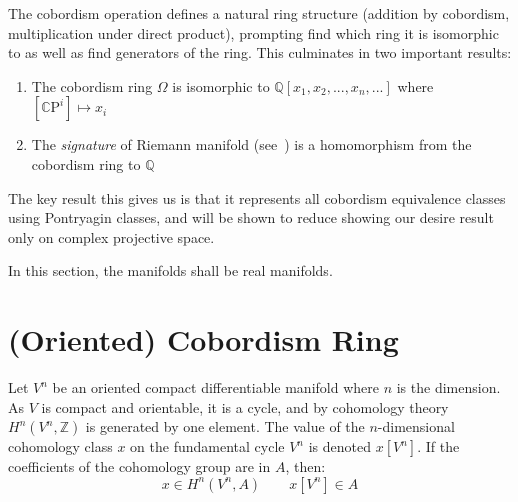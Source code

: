 \documentclass{book}
\newcommand{\Q}{{\mathbb{Q}}}
\newcommand{\Z}{{\mathbb{Z}}}
\newcommand{\CP}{\mathbb{C}\mathrm{P}}
\begin{document}
The cobordism operation defines a natural ring structure (addition by cobordism, multiplication under direct
product), prompting find which ring it is isomorphic to as
well as find generators of the ring. This culminates in two important results:
\begin{enumerate}
  \item The cobordism ring $\Omega$ is isomorphic to $\Q[x_1, x_2, ..., x_n, ...]$ where $[\CP^i] \mapsto x_i$
  \item The \emph{signature} of Riemann manifold (see~\cite{NateDiffGeo}) is a homomorphism from the cobordism
    ring to $\Q$
\end{enumerate}


The key result this gives us is that it represents all cobordism equivalence classes using Pontryagin classes,
and will be shown to reduce showing our desire result only on complex projective space.

In this section, the manifolds shall be real manifolds.



%

\section{(Oriented) Cobordism Ring}\label{sec:pontryaginNum}



Let $V^n$ be an oriented compact differentiable manifold where $n$ is the dimension. As $V$ is compact and
orientable, it is a cycle, and by cohomology theory $H^n(V^n, \Z)$ is generated by one element. The value of the
$n$-dimensional cohomology class $x$ on the fundamental cycle $V^n$ is denoted $x[V^n]$.  If the coefficients
of the cohomology group are in $A$, then:
\[
  x \in H^n(V^n, A) \qquad x[V^n] \in A
\]
\end{document}
